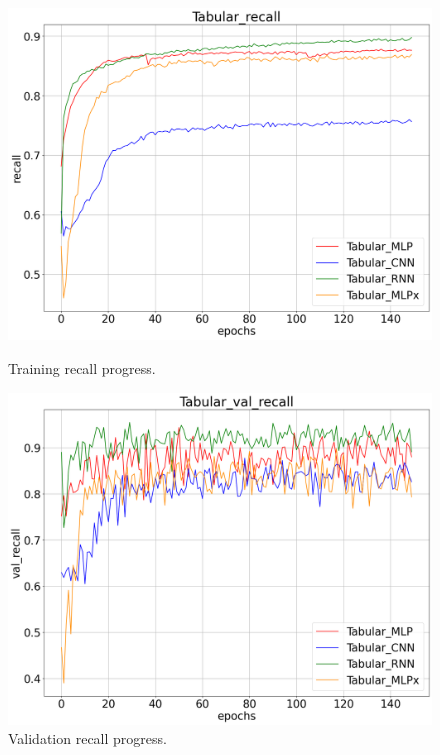 \begin{figure}[!ht]
    \centering
    \begin{minipage}{0.48\textwidth}
        \centering
        \includegraphics[width=\linewidth]{obrazky-figures/Tabular_experiment/recall_2023-03-23_15:04:45.png}
        \caption{Training recall progress.}
        \label{graph-tabular-recall}
    \end{minipage}\hfill
    \begin{minipage}{0.48\textwidth}
        \centering
        \includegraphics[width=\linewidth]{obrazky-figures/Tabular_experiment/val_recall_2023-03-23_15:04:46.png}
        \caption{Validation recall progress.}
        \label{graph-tabular-val_recall}
    \end{minipage}
\end{figure}
